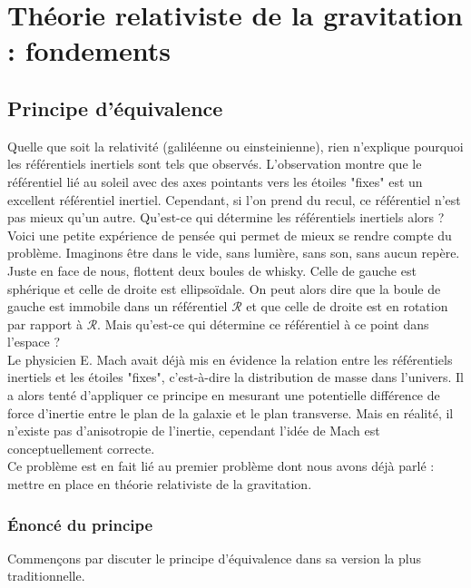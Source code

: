 \documentclass[a4paper,11pt]{report}
\theoremstyle{definition}
\theoremstyle{plain}
\theoremstyle{definition}
\theoremstyle{remark}
\newcommand{\R}{\mathcal{R}}
\begin{document}
\chapter{Théorie relativiste de la gravitation : fondements}

    \section{Principe d'équivalence}
    
        Quelle que soit la relativité (galiléenne ou einsteinienne), rien n'explique pourquoi les référentiels inertiels sont tels que observés. L'observation montre que le référentiel lié au soleil avec des axes pointants vers les étoiles "fixes" est un excellent référentiel inertiel. Cependant, si l'on prend du recul, ce référentiel n'est pas mieux qu'un autre. Qu'est-ce qui détermine les référentiels inertiels alors ?\\
            
        Voici une petite expérience de pensée qui permet de mieux se rendre compte du problème. Imaginons être dans le vide, sans lumière, sans son, sans aucun repère. Juste en face de nous, flottent deux boules de whisky. Celle de gauche est sphérique et celle de droite est ellipsoïdale. On peut alors dire que la boule de gauche est immobile dans un référentiel $\R$ et que celle de droite est en rotation par rapport à $\R$. Mais qu'est-ce qui détermine ce référentiel à ce point dans l'espace ?\\
        
        Le physicien E. Mach avait déjà mis en évidence la relation entre les référentiels inertiels et les étoiles "fixes", c'est-à-dire la distribution de masse dans l'univers. Il a alors tenté d'appliquer ce principe en mesurant une potentielle différence de force d'inertie entre le plan de la galaxie et le plan transverse. Mais en réalité, il n'existe pas d'anisotropie de l'inertie, cependant l'idée de Mach est conceptuellement correcte.\\
        
        Ce problème est en fait lié au premier problème dont nous avons déjà parlé : mettre en place en théorie relativiste de la gravitation.
    
        \subsection{Énoncé du principe}
        
            Commençons par discuter le principe d'équivalence dans sa version la plus traditionnelle.
            
\end{document}
